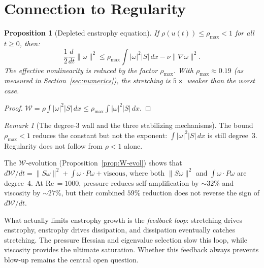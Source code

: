 \documentclass[11pt,a4paper]{article}
\theoremstyle{plain}
\newtheorem{proposition}[theorem]{Proposition}
\theoremstyle{definition}
\theoremstyle{remark}
\newtheorem{remark}[theorem]{Remark}
\begin{document}
\section{Connection to Regularity}\label{sec:regularity}

\begin{proposition}[Depleted enstrophy equation]
\label{prop:depleted}
If $\rho(u(t))\leq\rho_{\max}<1$ for all $t\geq 0$,
then:
\begin{equation}\label{eq:depleted-enst}
\frac{1}{2}\frac{d}{dt}\|\omega\|^2
\leq \rho_{\max}\int|\omega|^2|S|\,dx
- \nu\|\nabla\omega\|^2.
\end{equation}
The effective nonlinearity is reduced by the factor
$\rho_{\max}$.  With $\rho_{\max}\approx 0.19$
(as measured in Section~\ref{sec:numerics}), the
stretching is $5\times$ weaker than the worst case.
\end{proposition}

\begin{proof}
$\mathcal{W} = \rho\int|\omega|^2|S|\,dx
\leq\rho_{\max}\int|\omega|^2|S|\,dx$.
\end{proof}

\begin{remark}[The degree-3 wall and the
three stabilizing mechanisms]
\label{rem:wall}
The bound $\rho_{\max}<1$ reduces the constant
but not the exponent: $\int|\omega|^2|S|\,dx$
is still degree~3.  Regularity does not follow
from $\rho<1$ alone.

The $\mathcal{W}$-evolution
(Proposition~\ref{prop:W-evol}) shows that
$d\mathcal{W}/dt = \|S\omega\|^2
+ \int\omega\cdot P\omega + \text{viscous}$,
where both $\|S\omega\|^2$ and
$\int\omega\cdot P\omega$ are degree~4.
At Re$\,=1000$, pressure reduces
self-amplification by $\sim 32\%$ and viscosity
by $\sim 27\%$, but their combined $59\%$ reduction
does not reverse the sign of $d\mathcal{W}/dt$.

What actually limits enstrophy growth is the
\emph{feedback loop}: stretching drives enstrophy,
enstrophy drives dissipation, and dissipation
eventually catches stretching.  The pressure
Hessian and eigenvalue selection slow this loop,
while viscosity provides the ultimate saturation.
Whether this feedback always prevents blow-up
remains the central open question.
\end{remark}
\end{document}
